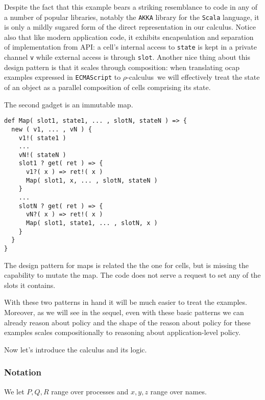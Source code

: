 \documentclass[]{amsart}
\theoremstyle{definition}
\theoremstyle{remark}
\numberwithin{equation}{subsection}
\newcommand{\rhoc}{$\rho$-calculus}
\begin{document}
Despite the fact that this example bears a striking resemblance to code
in any of a number of popular libraries, notably the {\tt AKKA}
library for the {\tt Scala} language, it is only a mildly sugared
form of the direct representation in our calculus. Notice also that
like modern application code, it exhibits encapsulation and separation
of implementation from API: a cell's internal access to
{\tt state} is kept in a private channel {\tt v} while
external access is through {\tt slot}. Another nice thing about
this design pattern is that it scales through composition: when
translating ocap examples expressed in {\tt ECMAScript} to \rhoc\
we will effectively treat the state of an object as a parallel
composition of cells comprising its state.

The second gadget is an immutable map.

\begin{verbatim}
def Map( slot1, state1, ... , slotN, stateN ) => {
  new ( v1, ... , vN ) {
    v1!( state1 )
    ...
    vN!( stateN )
    slot1 ? get( ret ) => { 
      v1?( x ) => ret!( x )
      Map( slot1, x, ... , slotN, stateN )
    }
    ...
    slotN ? get( ret ) => { 
      vN?( x ) => ret!( x )
      Map( slot1, state1, ... , slotN, x )
    }
  }
}
\end{verbatim}

The design pattern for maps is related the the one for cells, but is
missing the capability to mutate the map. The code does not serve a
request to set any of the slots it contains.

With these two patterns in hand it will be much easier to treat the
examples. Moreover, as we will see in the sequel, even with these
basic patterns we can already reason about policy and the shape of the
reason about policy for these examples scales compositionally to
reasoning about application-level policy.

Now let's introduce the calculus and its logic.

\subsubsection{Notation}

We let ${P, Q, R}$ range over processes and ${x, y, z}$ range over names.
\end{document}

